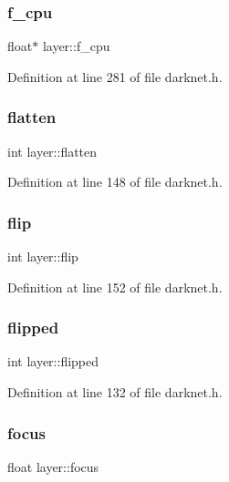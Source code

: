 \subsubsection{\texorpdfstring{f\_cpu}{f\_cpu}}
{\footnotesize\ttfamily float$\ast$ layer\+::f\+\_\+cpu}



Definition at line 281 of file darknet.\+h.

\mbox{\label{structlayer_abd9dc10c7124e7d7e54b3ad6811deb00}} 
\subsubsection{\texorpdfstring{flatten}{flatten}}
{\footnotesize\ttfamily int layer\+::flatten}



Definition at line 148 of file darknet.\+h.

\mbox{\label{structlayer_ade1cdfc041b6c641c73f74bea2492b5f}} 
\subsubsection{\texorpdfstring{flip}{flip}}
{\footnotesize\ttfamily int layer\+::flip}



Definition at line 152 of file darknet.\+h.

\mbox{\label{structlayer_a44bd658c46a69f7863d781eb731475b0}} 
\subsubsection{\texorpdfstring{flipped}{flipped}}
{\footnotesize\ttfamily int layer\+::flipped}



Definition at line 132 of file darknet.\+h.

\mbox{\label{structlayer_afa6d90f3ca746a776b5d79b3f8ead52d}} 
\subsubsection{\texorpdfstring{focus}{focus}}
{\footnotesize\ttfamily float layer\+::focus}



